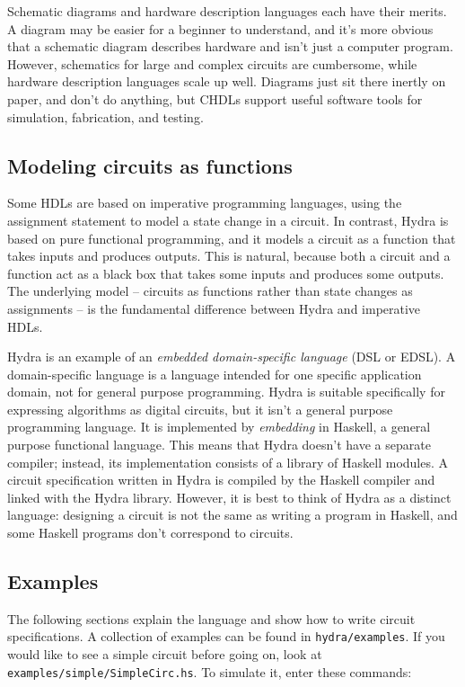 \documentclass[11pt]{article}
\begin{document}
Schematic diagrams and hardware description languages each have their
merits.  A diagram may be easier for a beginner to understand, and
it's more obvious that a schematic diagram describes hardware and
isn't just a computer program.  However, schematics for large and
complex circuits are cumbersome, while hardware description languages
scale up well.  Diagrams just sit there inertly on paper, and don't do
anything, but CHDLs support useful software tools for simulation,
fabrication, and testing.

\subsection{Modeling circuits as functions}
\label{sec:org7194c96}

Some HDLs are based on imperative programming languages, using the
assignment statement to model a state change in a circuit.  In
contrast, Hydra is based on pure functional programming, and it models
a circuit as a function that takes inputs and produces outputs. This
is natural, because both a circuit and a function act as a black box
that takes some inputs and produces some outputs.  The underlying
model -- circuits as functions rather than state changes as
assignments -- is the fundamental difference between Hydra and
imperative HDLs.

Hydra is an example of an \emph{embedded domain-specific language} (DSL or
EDSL).  A domain-specific language is a language intended for one
specific application domain, not for general purpose programming.
Hydra is suitable specifically for expressing algorithms as digital
circuits, but it isn't a general purpose programming language.  It is
implemented by \emph{embedding} in Haskell, a general purpose functional
language.  This means that Hydra doesn't have a separate compiler;
instead, its implementation consists of a library of Haskell
modules. A circuit specification written in Hydra is compiled by the
Haskell compiler and linked with the Hydra library.  However, it is
best to think of Hydra as a distinct language: designing a circuit is
not the same as writing a program in Haskell, and some Haskell
programs don't correspond to circuits.

\subsection{Examples}
\label{sec:org6696d8a}

The following sections explain the language and show how to write
circuit specifications.  A collection of examples can be found in
\texttt{hydra/examples}.  If you would like to see a simple circuit before
going on, look at \texttt{examples/simple/SimpleCirc.hs}.  To simulate it,
enter these commands:
\end{document}
